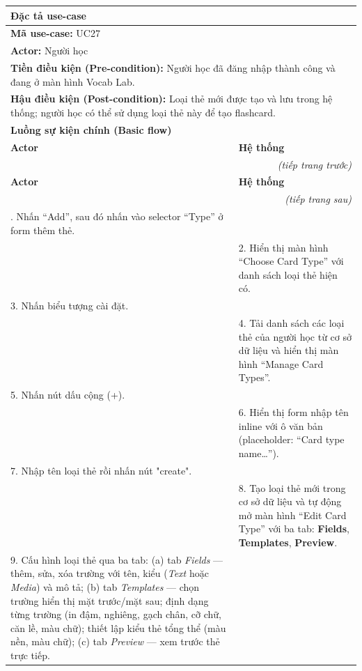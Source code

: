 \begin{longtable}{|p{\tbu}|p{\tbu}|}
    \hline
    \multicolumn{2}{|l|}{\textbf{Đặc tả use-case}} \\ \hline
    \multicolumn{2}{|l|}{\textbf{Mã use-case:} UC27} \\ \hline
    \multicolumn{2}{|l|}{\textbf{Actor:} Người học} \\ \hline
    \multicolumn{2}{|p{\dimexpr\linewidth-2\tabcolsep-2\arrayrulewidth\relax}|}{\textbf{Tiền điều kiện (Pre-condition):} Người học đã đăng nhập thành công và đang ở màn hình Vocab Lab.} \\ \hline
    \multicolumn{2}{|p{\dimexpr\linewidth-2\tabcolsep-2\arrayrulewidth\relax}|}{\textbf{Hậu điều kiện (Post-condition):} Loại thẻ mới được tạo và lưu trong hệ thống; người học có thể sử dụng loại thẻ này để tạo flashcard.} \\ \hline
    \multicolumn{2}{|l|}{\textbf{Luồng sự kiện chính (Basic flow)}} \\ \hline
    \textbf{Actor} & \textbf{Hệ thống} \\ \hline
    \endfirsthead
    \multicolumn{2}{r}{\textit{(tiếp trang trước)}} \\
    \hline
    \textbf{Actor} & \textbf{Hệ thống} \\ \hline
    \endhead
    \hline
    \multicolumn{2}{r}{\textit{(tiếp trang sau)}} \\
    \endfoot
    \endlastfoot
    1. Nhấn ``Add'', sau đó nhấn vào selector ``Type'' ở form thêm thẻ. & \\ \hline
    & 2. Hiển thị màn hình ``Choose Card Type'' với danh sách loại thẻ hiện có. \\ \hline
    3. Nhấn biểu tượng cài đặt. & \\ \hline
    & 4. Tải danh sách các loại thẻ của người học từ cơ sở dữ liệu và hiển thị màn hình ``Manage Card Types''. \\ \hline
    5. Nhấn nút dấu cộng (+). & \\ \hline
    & 6. Hiển thị form nhập tên inline với ô văn bản (placeholder: ``Card type name\ldots''). \\ \hline
    7. Nhập tên loại thẻ rồi nhấn nút "create". & \\ \hline
    & 8. Tạo loại thẻ mới trong cơ sở dữ liệu và tự động mở màn hình ``Edit Card Type'' với ba tab: \textbf{Fields}, \textbf{Templates}, \textbf{Preview}. \\ \hline
    9. Cấu hình loại thẻ qua ba tab: (a) tab \textit{Fields} --- thêm, sửa, xóa trường với tên, kiểu (\textit{Text} hoặc \textit{Media}) và mô tả; (b) tab \textit{Templates} --- chọn trường hiển thị mặt trước/mặt sau; định dạng từng trường (in đậm, nghiêng, gạch chân, cỡ chữ, căn lề, màu chữ); thiết lập kiểu thẻ tổng thể (màu nền, màu chữ); (c) tab \textit{Preview} --- xem trước thẻ trực tiếp. & \\ \hline

\end{longtable}
